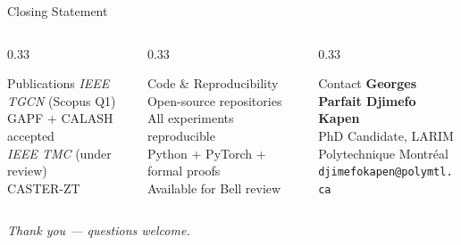 \documentclass[aspectratio=169, 11pt]{beamer}
\begin{document}
\begin{frame}{Closing Statement}

\vspace{0.5cm}

\vspace{0.6cm}

\begin{columns}[c]
\begin{column}{0.33\textwidth}
  \centering
  \begin{block}{\centering Publications}
    \scriptsize
    \textit{IEEE TGCN} (Scopus Q1) \\
    GAPF + CALASH accepted\\[2pt]
    \textit{IEEE TMC} (under review)\\
    CASTER-ZT
  \end{block}
\end{column}
\begin{column}{0.33\textwidth}
  \centering
  \begin{block}{\centering Code \& Reproducibility}
    \scriptsize
    Open-source repositories\\
    All experiments reproducible\\
    Python + PyTorch + formal proofs\\
    Available for Bell review
  \end{block}
\end{column}
\begin{column}{0.33\textwidth}
  \centering
  \begin{block}{\centering Contact}
    \scriptsize
    \textbf{Georges Parfait Djimefo Kapen}\\
    PhD Candidate, LARIM\\
    Polytechnique Montréal\\
    {\footnotesize\texttt{djimefokapen@polymtl.ca}}
  \end{block}
\end{column}
\end{columns}

\vspace{0.3cm}
\centering
\textcolor{bellgray}{\small \textit{Thank you — questions welcome.}}

\end{frame}
\end{document}
